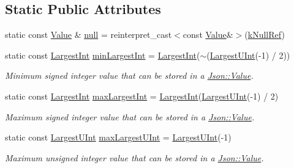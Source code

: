 \subsection*{Static Public Attributes}
\begin{DoxyCompactItemize}
\item 
static const \hyperlink{class_json_1_1_value}{Value} \& \hyperlink{class_json_1_1_value_a6d6e9ea6807e46d5b7ded66d3032f607}{null} = reinterpret\-\_\-cast$<$const \hyperlink{class_json_1_1_value}{Value}\&$>$(\hyperlink{namespace_json_ab30055b4bbd82aecaca57ccecd63bbe6}{k\-Null\-Ref})
\item 
static const \hyperlink{class_json_1_1_value_a1cbb82642ed05109b9833e49f042ece7}{Largest\-Int} \hyperlink{class_json_1_1_value_af91df130daa50dd43d2cd89e6ee67706}{min\-Largest\-Int} = \hyperlink{class_json_1_1_value_a1cbb82642ed05109b9833e49f042ece7}{Largest\-Int}($\sim$(\hyperlink{class_json_1_1_value_a6682a3684d635e03fc06ba229fa24eec}{Largest\-U\-Int}(-\/1) / 2))
\begin{DoxyCompactList}\small\item\em Minimum signed integer value that can be stored in a \hyperlink{class_json_1_1_value}{Json\-::\-Value}. \end{DoxyCompactList}\item 
static const \hyperlink{class_json_1_1_value_a1cbb82642ed05109b9833e49f042ece7}{Largest\-Int} \hyperlink{class_json_1_1_value_a8b4977696f13296fa8755c7953fafb2f}{max\-Largest\-Int} = \hyperlink{class_json_1_1_value_a1cbb82642ed05109b9833e49f042ece7}{Largest\-Int}(\hyperlink{class_json_1_1_value_a6682a3684d635e03fc06ba229fa24eec}{Largest\-U\-Int}(-\/1) / 2)
\begin{DoxyCompactList}\small\item\em Maximum signed integer value that can be stored in a \hyperlink{class_json_1_1_value}{Json\-::\-Value}. \end{DoxyCompactList}\item 
static const \hyperlink{class_json_1_1_value_a6682a3684d635e03fc06ba229fa24eec}{Largest\-U\-Int} \hyperlink{class_json_1_1_value_a8ddb32d9d55fa5323ae5135639dc2e31}{max\-Largest\-U\-Int} = \hyperlink{class_json_1_1_value_a6682a3684d635e03fc06ba229fa24eec}{Largest\-U\-Int}(-\/1)
\begin{DoxyCompactList}\small\item\em Maximum unsigned integer value that can be stored in a \hyperlink{class_json_1_1_value}{Json\-::\-Value}. \end{DoxyCompactList}\item 

\end{DoxyCompactItemize}

